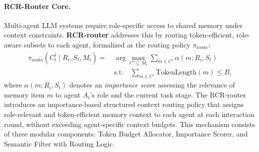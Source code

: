 \documentclass[letterpaper]{article} %
\newcommand{\zk}[1]{\textcolor{cyan}{#1}}
\begin{document}
\paragraph{RCR-Router Core.}



Multi-agent LLM systems require role-specific access to shared memory under context constraints.
\textbf{RCR-router}
addresses this by routing token-efficient, role-aware subsets to each agent, formalized as the routing policy $\pi_{\text{route}}$: %
\begin{equation}
\begin{aligned}
\pi_{\text{route}}(C_t^i \mid R_i, S_t, M_t) = \ & \arg\max_{C' \subseteq M_t} \sum_{m \in C'} \alpha(m; R_i, S_t) \\
& \text{s.t.} \quad \sum_{m \in C'} \text{TokenLength}(m) \leq B_i
\end{aligned}
\end{equation}
where $\alpha(m; R_i, S_t)$ denotes an \textit{importance score} assessing the relevance of memory item $m$ to agent $A_i$’s role and the current task stage. 
The RCR-router introduces an importance-based structured context routing policy that assigns role-relevant and token-efficient memory context to each agent at each interaction round, without exceeding agent-specific context budgets. This mechanism consists of three modular components: Token Budget Allocator, Importance Scorer, and Semantic Filter with Routing Logic.
\end{document}
